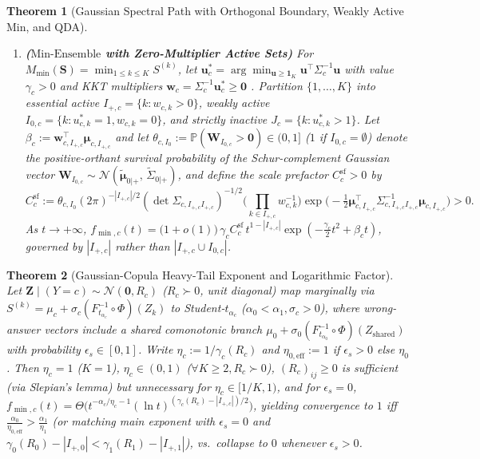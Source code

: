 \documentclass[10pt]{article}
\theoremstyle{plain}
\newtheorem{theorem}{Theorem}
\theoremstyle{definition}
\theoremstyle{remark}
\newcommand{\Prob}{\mathbb{P}}
\begin{document}
\begin{theorem}[Gaussian Spectral Path with Orthogonal Boundary, Weakly Active $\mathrm{Min}$, and QDA]
\begin{enumerate}[leftmargin=1.6em,itemsep=2pt,topsep=1pt]
    \item \textbf{($\mathrm{Min\text{-}Ensemble}$ with Zero-Multiplier Active Sets)} For $M_{\min}(\mathbf{S}) = \min_{1\le k\le K} S^{(k)}$, let $\mathbf{u}_c^* = \arg\min_{\mathbf{u}\ge\mathbf{1}_K}\mathbf{u}^\top\Sigma_c^{-1}\mathbf{u}$ with value $\gamma_c > 0$ and KKT multipliers $\mathbf{w}_c = \Sigma_c^{-1}\mathbf{u}_c^* \ge \mathbf{0}$ \citep{savage1962mills,hashorva2003multivariate}. Partition $\{1,\dots,K\}$ into essential active $I_{+,c} = \{k : w_{c,k} > 0\}$, weakly active $I_{0,c} = \{k : u_{c,k}^*=1, w_{c,k}=0\}$, and strictly inactive $J_c = \{k : u_{c,k}^* > 1\}$. Let $\beta_c := \mathbf{w}_{c, I_{+,c}}^\top \boldsymbol{\mu}_{c, I_{+,c}}$ and let $\theta_{c, I_0} := \Prob(\mathbf{W}_{I_{0,c}} > \mathbf{0}) \in (0, 1]$ ($1$ if $I_{0,c}=\emptyset$) denote the positive-orthant survival probability of the Schur-complement Gaussian vector $\mathbf{W}_{I_{0,c}} \sim \mathcal{N}(\tilde{\boldsymbol{\mu}}_{0|+},\allowbreak\,\tilde{\Sigma}_{0|+})$, and define the scale prefactor $C_c^{\mathrm{sf}} > 0$ by
    \[
    C_c^{\mathrm{sf}} := \theta_{c, I_0}(2\pi)^{-|I_{+,c}|/2}(\det \Sigma_{c, I_{+,c}I_{+,c}})^{-1/2}\Big(\prod_{k\in I_{+,c}} w_{c,k}^{-1}\Big)\exp\!\Big(-\tfrac{1}{2}\boldsymbol{\mu}_{c, I_{+,c}}^\top\Sigma_{c, I_{+,c}I_{+,c}}^{-1}\boldsymbol{\mu}_{c, I_{+,c}}\Big) > 0.
    \]
    As $t \to +\infty$, $f_{\min, c}(t) = \big(1 + o(1)\big)\, \gamma_c C_c^{\mathrm{sf}}\, t^{1 - |I_{+,c}|}\exp\!\left(-\frac{\gamma_c}{2}t^2 + \beta_c t\right)$, governed by $|I_{+,c}|$ rather than $|I_{+,c} \cup I_{0,c}|$.
\end{enumerate}
\end{theorem}

\begin{theorem}[Gaussian-Copula Heavy-Tail Exponent and Logarithmic Factor]
\label{thm:copula}
Let $\mathbf{Z} \mid (Y=c) \sim \mathcal{N}(\mathbf{0}, R_c)$ ($R_c \succ 0$, unit diagonal) map marginally via $S^{(k)} = \mu_c + \sigma_c (F_{t_{\alpha_c}}^{-1}\circ \Phi)(Z_k)$ to Student-$t_{\alpha_c}$ ($\alpha_0 < \alpha_1, \sigma_c > 0$), where wrong-answer vectors include a shared comonotonic branch $\mu_0 + \sigma_0(F_{t_{\alpha_0}}^{-1}\circ\Phi)(Z_{\mathrm{shared}})$ with probability $\epsilon_s \in [0, 1]$. Write $\eta_c := 1/\gamma_c(R_c)$ \citep{tankov2016tails,das2024heavy} and $\eta_{0,\mathrm{eff}} := 1$ if $\epsilon_s > 0$ else $\eta_0$. Then $\eta_c = 1$ ($K=1$), $\eta_c \in (0, 1)$ ($\forall K \ge 2, R_c \succ 0$), $(R_c)_{ij} \ge 0$ is sufficient (via Slepian's lemma) but unnecessary for $\eta_c \in [1/K, 1)$, and for $\epsilon_s = 0$, $f_{\min, c}(t) = \Theta\big(t^{-\alpha_c/\eta_c - 1}(\ln t)^{(\gamma_c(R_c) - |I_{+,c}|)/2}\big)$, yielding convergence to $1$ iff $\frac{\alpha_0}{\eta_{0,\mathrm{eff}}} > \frac{\alpha_1}{\eta_1}$ (or matching main exponent with $\epsilon_s = 0$ and $\gamma_0(R_0) - |I_{+,0}| < \gamma_1(R_1) - |I_{+,1}|$), vs.\ collapse to $0$ whenever $\epsilon_s > 0$.
\end{theorem}
\end{document}
